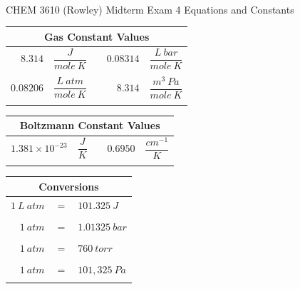 \documentclass[12pt, letterpaper]{memoir}
\begin{document}
\newpage
\pagestyle{empty}

~
\vspace{-3em}
\begin{center}
	{\LARGE CHEM 3610 (Rowley) Midterm Exam 4 Equations and Constants}
\end{center}

\vspace{-1em}\noindent
\begin{minipage}{0.57\linewidth}
	\begin{mdframed}
		\begin{tabular}{rlcrl}
			\multicolumn{5}{c}{Gas Constant Values}                                       \\ \midrule
			$8.314$   & $\dfrac{J}{mole~K}$     &  & $0.08314$ & $\dfrac{L~bar}{mole~K}$  \\ \\
			$0.08206$ & $\dfrac{L~atm}{mole~K}$ &  & $8.314$   & $\dfrac{m^3~Pa}{mole~K}$ \\ \\
		\end{tabular}
		\begin{tabular}{rlcrl}
			\multicolumn{5}{c}{Boltzmann Constant Values}                                 \\ \midrule
			$1.381 \times 10^{-23}$ & $\dfrac{J}{K}$ &  & $0.6950$ & $\dfrac{cm^{-1}}{K}$ \\ \\
		\end{tabular}
	\end{mdframed}
\end{minipage}
\hspace{20pt}
\begin{minipage}{0.4\linewidth}
	\begin{mdframed}
		\begin{tabular}{rcl}
			\multicolumn{3}{c}{Conversions}  \\ \midrule
			$1~L~atm $ & $=$ & $101.325~J$   \\ \\
			$1~atm $   & $=$ & $1.01325~bar$ \\ \\
			$1~atm $   & $=$ & $760~torr$    \\ \\
			$1~atm $   & $=$ & $101,325~Pa$  \\ \\
		\end{tabular}
	\end{mdframed}
\end{minipage}
\end{document}
